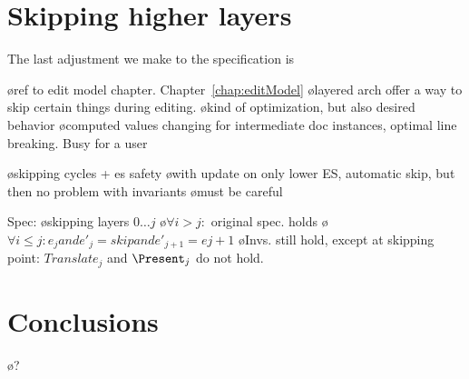 \section{Skipping higher layers} \label{sect:specSkipLayers}

The last adjustment we make to the specification is 

\bl
\o ref to edit model chapter. Chapter~\ref{chap:editModel}
\o layered arch offer a way to skip certain things during editing.
\o kind of optimization, but also desired behavior
\o computed values changing for intermediate doc instances, optimal line breaking. Busy for a user 
\el

\bl
\o skipping cycles + es safety
\o with update on only lower ES, automatic skip, but then no problem with invariants
\o must be careful
\el

Spec:
\bl
\o skipping layers $0\dots j$
\o $\forall i>j:$ original spec. holds
\o $\forall i\le j: e_j and e'_j = skip and e'_{j+1} = e{j+1}$  
\o Invs. still hold, except at skipping point: $Translate_j$ and $\Present_j$ do not hold.
\el

\section{Conclusions}

\bl
\o ?
\el




